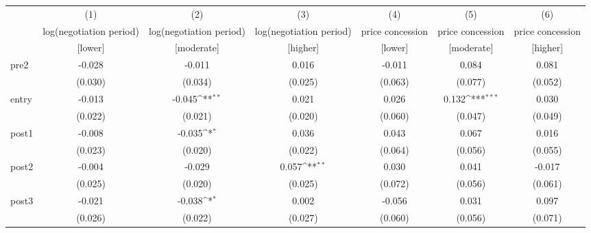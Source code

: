 {
\def\sym#1{\ifmmode^{#1}\else\(^{#1}\)\fi}
\begin{adjustbox}{max width=\textwidth}
\begin{tabular}{l*{6}{c}}
\toprule
            &\multicolumn{1}{c}{(1)}&\multicolumn{1}{c}{(2)}&\multicolumn{1}{c}{(3)}&\multicolumn{1}{c}{(4)}&\multicolumn{1}{c}{(5)}&\multicolumn{1}{c}{(6)}\\
            &\multicolumn{1}{c}{log(negotiation period)}&\multicolumn{1}{c}{log(negotiation period)}&\multicolumn{1}{c}{log(negotiation period)}&\multicolumn{1}{c}{price concession}&\multicolumn{1}{c}{price concession}&\multicolumn{1}{c}{price concession}\\
            &[lower]&[moderate]&[higher]&[lower]&[moderate]&[higher]\\
\midrule
pre2        &      -0.028         &      -0.011         &       0.016         &      -0.011         &       0.084         &       0.081         \\
            &     (0.030)         &     (0.034)         &     (0.025)         &     (0.063)         &     (0.077)         &     (0.052)         \\
\addlinespace
entry       &      -0.013         &      -0.045\sym{**} &       0.021         &       0.026         &       0.132\sym{***}&       0.030         \\
            &     (0.022)         &     (0.021)         &     (0.020)         &     (0.060)         &     (0.047)         &     (0.049)         \\
\addlinespace
post1       &      -0.008         &      -0.035\sym{*}  &       0.036         &       0.043         &       0.067         &       0.016         \\
            &     (0.023)         &     (0.020)         &     (0.022)         &     (0.064)         &     (0.056)         &     (0.055)         \\
\addlinespace
post2       &      -0.004         &      -0.029         &       0.057\sym{**} &       0.030         &       0.041         &      -0.017         \\
            &     (0.025)         &     (0.020)         &     (0.025)         &     (0.072)         &     (0.056)         &     (0.061)         \\
\addlinespace
post3       &      -0.021         &      -0.038\sym{*}  &       0.002         &      -0.056         &       0.031         &       0.097         \\
            &     (0.026)         &     (0.022)         &     (0.027)         &     (0.060)         &     (0.056)         &     (0.071)         \\

\end{tabular}
\end{adjustbox}}
